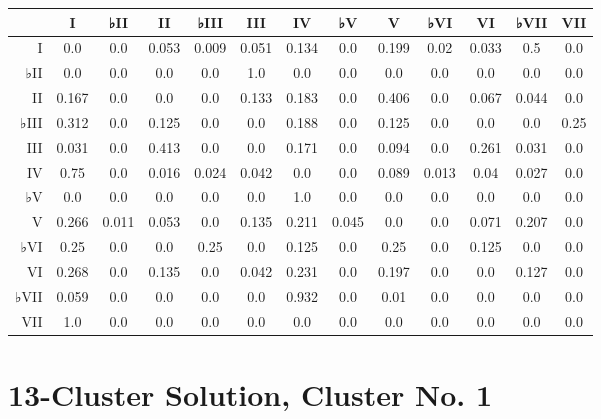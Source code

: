 \begin{table}[htbp]
\begin{minipage}{\linewidth}
\setlength{\tymax}{0.5\linewidth}
\centering
\small
\begin{tabulary}{\textwidth}{@{}RCCCCCCCCCCCC@{}} \toprule
&I&♭II&II&♭III&III&IV&♭V&V&♭VI&VI&♭VII&VII\\
\midrule
I&0.0&0.0&0.053&0.009&0.051&0.134&0.0&0.199&0.02&0.033&0.5&0.0\\
♭II&0.0&0.0&0.0&0.0&1.0&0.0&0.0&0.0&0.0&0.0&0.0&0.0\\
II&0.167&0.0&0.0&0.0&0.133&0.183&0.0&0.406&0.0&0.067&0.044&0.0\\
♭III&0.312&0.0&0.125&0.0&0.0&0.188&0.0&0.125&0.0&0.0&0.0&0.25\\
III&0.031&0.0&0.413&0.0&0.0&0.171&0.0&0.094&0.0&0.261&0.031&0.0\\
IV&0.75&0.0&0.016&0.024&0.042&0.0&0.0&0.089&0.013&0.04&0.027&0.0\\
♭V&0.0&0.0&0.0&0.0&0.0&1.0&0.0&0.0&0.0&0.0&0.0&0.0\\
V&0.266&0.011&0.053&0.0&0.135&0.211&0.045&0.0&0.0&0.071&0.207&0.0\\
♭VI&0.25&0.0&0.0&0.25&0.0&0.125&0.0&0.25&0.0&0.125&0.0&0.0\\
VI&0.268&0.0&0.135&0.0&0.042&0.231&0.0&0.197&0.0&0.0&0.127&0.0\\
♭VII&0.059&0.0&0.0&0.0&0.0&0.932&0.0&0.01&0.0&0.0&0.0&0.0\\
VII&1.0&0.0&0.0&0.0&0.0&0.0&0.0&0.0&0.0&0.0&0.0&0.0\\

\bottomrule

\end{tabulary}
\end{minipage}
\end{table}

\section{13-Cluster Solution, Cluster No. 1}
\label{13-clustersolutionclusterno.1}

